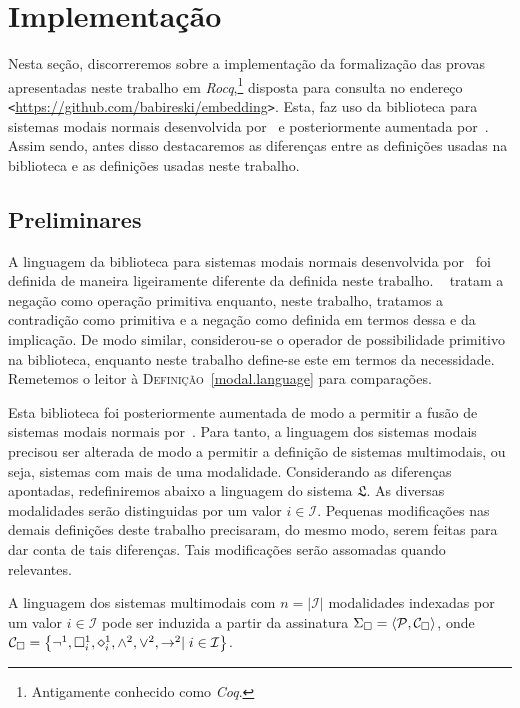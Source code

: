 \chapter{Implementação}\label{implementation}

Nesta seção, discorreremos sobre a implementação da formalização das provas apresentadas neste trabalho em \emph{Rocq},\footnote{Antigamente conhecido como \emph{Coq}.} disposta para consulta no endereço \texttt{<}\url{https://github.com/babireski/embedding}\texttt{>}.
Esta, faz uso da biblioteca para sistemas modais normais desenvolvida por~\cite{Silveira+others.2022} e posteriormente aumentada por~\cite{Nunes+others.2025}.
Assim sendo, antes disso destacaremos as diferenças entre as definições usadas na biblioteca e as definições usadas neste trabalho.

\section{Preliminares}

A linguagem da biblioteca para sistemas modais normais desenvolvida por~\cite{Silveira+others.2022} foi definida de maneira ligeiramente diferente da definida neste trabalho.
~\cite{Silveira+others.2022} tratam a negação como operação primitiva enquanto, neste trabalho, tratamos a contradição como primitiva e a negação como definida em termos dessa e da implicação.
De modo similar, considerou-se o operador de possibilidade primitivo na biblioteca, enquanto neste trabalho define-se este em termos da necessidade.
Remetemos o leitor à \textsc{Definição}~\ref{modal.language} para comparações.

\vspace{0.5\baselineskip}
Esta biblioteca foi posteriormente aumentada de modo a permitir a fusão de sistemas modais normais por~\cite{Nunes+others.2025}.
Para tanto, a linguagem dos sistemas modais precisou ser alterada de modo a permitir a definição de sistemas multimodais, ou seja, sistemas com mais de uma modalidade.
Considerando as diferenças apontadas, redefiniremos abaixo a linguagem do sistema $\mathfrak{L}$.
As diversas modalidades serão distinguidas por um valor $i\in\mathcal{I}$.
Pequenas modificações nas demais definições deste trabalho precisaram, do mesmo modo, serem feitas para dar conta de tais diferenças.
Tais modificações serão assomadas quando relevantes.

\vspace{0.5\baselineskip}
\begin{tcolorbox}[enhanced jigsaw, breakable, sharp corners, colframe=black, colback=white, boxrule=0.5pt, left=1.5mm, right=1.5mm, top=1.5mm, bottom=1.5mm]
\begin{definition}
    A linguagem dos sistemas multimodais com $n=|\mathcal{I}|$ modalidades indexadas por um valor $i\in\mathcal{I}$ pode ser induzida a partir da assinatura $\Sigma_{\Box}=\langle\mathcal{P},\mathcal{C}_{\Box}\rangle$, onde $\mathcal{C}_{\nec}=\set{\neg^1,\nec^1_i,\pos^1_i,\wedge^2,\vee^2,\to^2\mid i\in\mathcal{I}}$.
\end{definition}
\end{tcolorbox}

